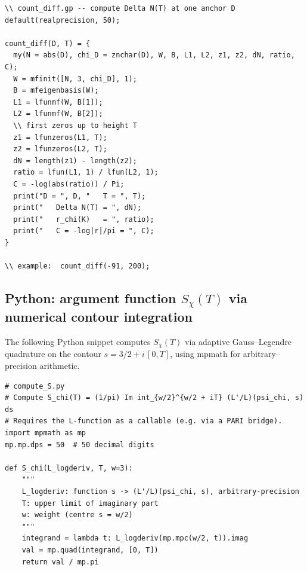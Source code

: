\documentclass[11pt]{amsart}
\theoremstyle{definition}
\theoremstyle{remark}
\begin{document}
\begin{lstlisting}[style=pari, caption={PARI/GP: counting--function
difference and predicted constant.}]
\\ count_diff.gp -- compute Delta N(T) at one anchor D
default(realprecision, 50);

count_diff(D, T) = {
  my(N = abs(D), chi_D = znchar(D), W, B, L1, L2, z1, z2, dN, ratio, C);
  W = mfinit([N, 3, chi_D], 1);
  B = mfeigenbasis(W);
  L1 = lfunmf(W, B[1]);
  L2 = lfunmf(W, B[2]);
  \\ first zeros up to height T
  z1 = lfunzeros(L1, T);
  z2 = lfunzeros(L2, T);
  dN = length(z1) - length(z2);
  ratio = lfun(L1, 1) / lfun(L2, 1);
  C = -log(abs(ratio)) / Pi;
  print("D = ", D, "   T = ", T);
  print("   Delta N(T) = ", dN);
  print("   r_chi(K)   = ", ratio);
  print("   C = -log|r|/pi = ", C);
}

\\ example:  count_diff(-91, 200);
\end{lstlisting}

\subsection{Python: argument function \(S_\chi(T)\) via numerical
contour integration}\label{ssec:python-S}
The following Python snippet computes \(S_\chi(T)\) via adaptive
Gauss--Legendre quadrature on the contour
\(s = 3/2 + i\,[0, T]\), using mpmath for arbitrary--precision
arithmetic.

\begin{lstlisting}[style=pari, caption={Python: \(S_\chi(T)\) via
contour integration.}]
# compute_S.py
# Compute S_chi(T) = (1/pi) Im int_{w/2}^{w/2 + iT} (L'/L)(psi_chi, s) ds
# Requires the L-function as a callable (e.g. via a PARI bridge).
import mpmath as mp
mp.mp.dps = 50  # 50 decimal digits

def S_chi(L_logderiv, T, w=3):
    """
    L_logderiv: function s -> (L'/L)(psi_chi, s), arbitrary-precision
    T: upper limit of imaginary part
    w: weight (centre s = w/2)
    """
    integrand = lambda t: L_logderiv(mp.mpc(w/2, t)).imag
    val = mp.quad(integrand, [0, T])
    return val / mp.pi
\end{lstlisting}
\end{document}
